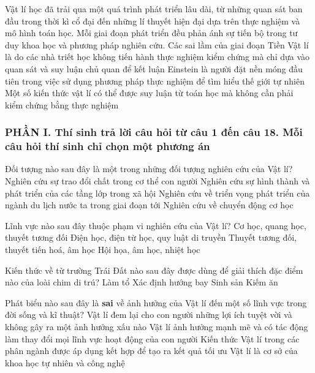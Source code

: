 \begin{ex}%
Vật lí học đã trải qua một quá trình phát triển lâu dài, từ những quan sát ban đầu trong thời kì cổ đại đến những lí thuyết hiện đại dựa trên thực nghiệm và mô hình toán học. Mỗi giai đoạn phát triển đều phản ánh sự tiến bộ trong tư duy khoa học và phương pháp nghiên cứu. 
{\True Các sai lầm của giai đoạn Tiền Vật lí là do các nhà triết học không tiến hành thực nghiệm kiểm chứng mà chỉ dựa vào quan sát và suy luận chủ quan để kết luận} 
{Einstein là người đặt nền móng đầu tiên trong việc sử dụng phương pháp thực nghiệm để tìm hiểu thế giới tự nhiên} 
{Một số kiến thức vật lí có thể được suy luận từ toán học mà không cần phải kiểm chứng bằng thực nghiệm} 
\loigiai{ 
\begin{itemchoice}
\itemch
\itemch
\itemch
\itemch
\end{itemchoice}
}
\end{ex}
\newpage 
{}
\subsubsection*{PHẦN I. Thí sinh trả lời câu hỏi từ câu 1 đến câu 18. Mỗi câu hỏi thí sinh chỉ chọn một phương án}
\setcounter{ex}{0}
\begin{ex}%
Đối tượng nào sau đây là một trong những đối tượng nghiên cứu của Vật lí?
\choice
{Nghiên cứu sự trao đổi chất trong cơ thể con người}
{Nghiên cứu sự hình thành và phát triển của các tầng lớp trong xã hội}
{Nghiên cứu về triển vọng phát triển của ngành du lịch nước ta trong giai đoạn tới}
{\True Nghiên cứu về chuyển động cơ học}

\end{ex}

\begin{ex}%
Lĩnh vực nào sau đây thuộc phạm vi nghiên cứu của Vật lí?
\choice
{\True Cơ học, quang học, thuyết tương đối}
{Điện học, điện từ học, quy luật di truyền}
{Thuyết tương đối, thuyết tiến hoá, âm học}
{Hội họa, âm học, nhiệt học}

\end{ex}
\begin{ex}%
Kiến thức về từ trường Trái Đất nào sau đây được dùng để giải thích đặc điểm nào của loài chim di trú?
\choice
{Làm tổ}
{\True Xác định hướng bay}
{Sinh sản}
{Kiếm ăn}

\end{ex}
\begin{ex}%
Phát biểu nào sau đây là \textbf{sai} về ảnh hưởng của Vật lí đến một số lĩnh vực trong đời sống và kĩ thuật?
\choice
{\True Vật lí đem lại cho con người những lợi ích tuyệt vời và không gây ra một ảnh hưởng xấu nào}
{Vật lí ảnh hưởng mạnh mẽ và có tác động làm thay đổi mọi lĩnh vực hoạt động của con người}
{Kiến thức Vật lí trong các phân ngành được áp dụng kết hợp để tạo ra kết quả tối ưu}
{Vật lí là cơ sở của khoa học tự nhiên và công nghệ}
\end{ex}

